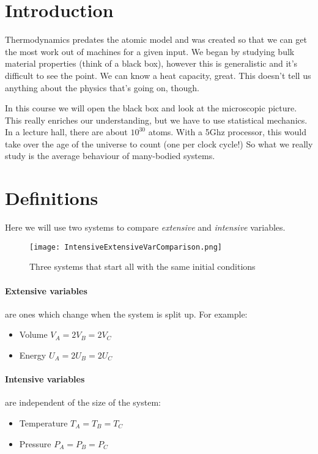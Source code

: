 \section{Introduction}

Thermodynamics predates the atomic model and was created so that we can get the
most work out of machines for a given input. We began by studying bulk material
properties (think of a black box), however this is generalistic and it's
difficult to see the point. We can know a heat capacity, great. This doesn't
tell us anything about the physics that's going on, though.

In this course we will open the black box and look at the microscopic picture.
This really enriches our understanding, but we have to use statistical
mechanics. In a lecture hall, there are about $10^{30}$ atoms. With a 5Ghz
processor, this would take over the age of the universe to count (one per clock
cycle!) So what we really study is the average behaviour of many-bodied systems.

\section{Definitions}

Here we will use two systems to compare \emph{extensive} and \emph{intensive}
variables.
\begin{figure}[h!]
	\centering
	\texttt{[image: IntensiveExtensiveVarComparison.png]}
	\caption{Three systems that start all with the same initial conditions}
\end{figure}
\paragraph{Extensive variables} are ones which change when the system is split
up. For example:
\begin{itemize}
	\item Volume $V_A = 2V_B = 2V_C$
	\item Energy $U_A = 2U_B = 2U_C$
\end{itemize}

\paragraph{Intensive variables} are independent of the size of the system:
\begin{itemize}
	\item Temperature $T_A = T_B = T_C$
	\item Pressure $P_A = P_B = P_C$
\end{itemize}

